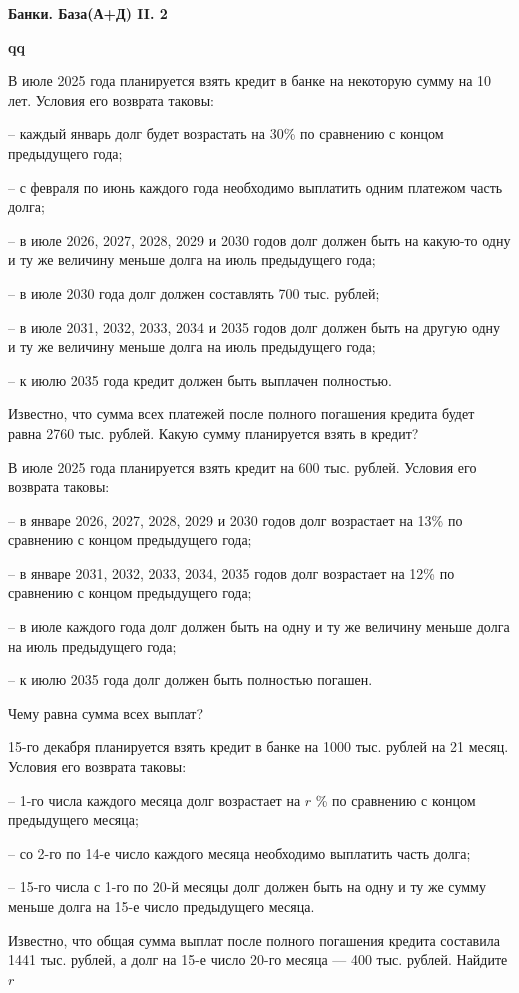 \centerline{\bf \Huge Банки. База(А+Д) II. 2}
\centerline{\bf \Huge }

\begin{flushright}
        \scriptsize{\textbf{qq}}
\end{flushright}


 В июле 2025 года планируется взять кредит в банке на некоторую сумму на 10 лет. Условия его возврата таковы:

– каждый январь долг будет возрастать на 30\% по сравнению с концом предыдущего года;

– с февраля по июнь каждого года необходимо выплатить одним платежом часть долга;

– в июле 2026, 2027, 2028, 2029 и 2030 годов долг должен быть на какую-то одну и ту же
величину меньше долга на июль предыдущего года;

– в июле 2030 года долг должен составлять 700 тыс. рублей;

– в июле 2031, 2032, 2033, 2034 и 2035 годов долг должен быть на другую одну и ту же
величину меньше долга на июль предыдущего года;

– к июлю 2035 года кредит должен быть выплачен полностью.

Известно, что сумма всех платежей после полного погашения кредита будет равна 2760 тыс.
рублей. Какую сумму планируется взять в кредит?

 В июле 2025 года планируется взять кредит на 600 тыс. рублей. Условия его возврата таковы:

– в январе 2026, 2027, 2028, 2029 и 2030 годов долг возрастает на 13\% по сравнению с концом
предыдущего года;

– в январе 2031, 2032, 2033, 2034, 2035 годов долг возрастает на 12\% по сравнению с концом
предыдущего года;

– в июле каждого года долг должен быть на одну и ту же величину меньше долга на июль
предыдущего года;

– к июлю 2035 года долг должен быть полностью погашен.

Чему равна сумма всех выплат?


 15-го декабря планируется взять кредит в банке на 1000 тыс. рублей на 21 месяц. Условия его возврата таковы:

– 1-го числа каждого месяца долг возрастает на $r$ \% по сравнению с концом предыдущего
месяца;

– со 2-го по 14-е число каждого месяца необходимо выплатить часть долга;

– 15-го числа с 1-го по 20-й месяцы долг должен быть на одну и ту же сумму меньше долга
на 15-е число предыдущего месяца.

Известно, что общая сумма выплат после полного погашения кредита составила 1441 тыс.
рублей, а долг на 15-е число 20-го месяца — 400 тыс. рублей. Найдите $r$